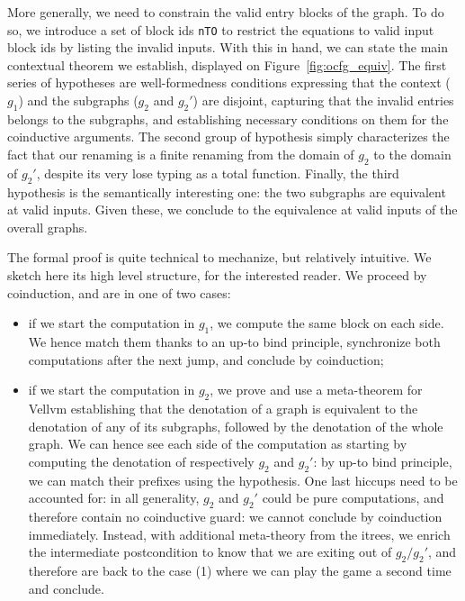 \documentclass[11pt]{article}
\newcommand{\inlinecoq}[1]{\mbox{\lstinline[style=customcoq,columns=fixed,basewidth=.48em]{#1}}}
\newcommand{\ilc}[1]{\inlinecoq{#1}}
\begin{document}
More generally, we need to constrain the valid entry blocks of the graph. 
To do so, we introduce a set of block ids \ilc{nTO} to restrict the equations to valid input block ids by listing the invalid inputs.
With this in hand, we can state the main contextual theorem we establish, displayed on Figure~\ref{fig:ocfg_equiv}.
The first series of hypotheses are well-formedness conditions expressing that the context ($g_1$) and the subgraphs ($g_2$ and $g_2'$) are disjoint,
capturing that the invalid entries belongs to the subgraphs,
and establishing necessary conditions on them for the coinductive arguments.
The second group of hypothesis simply characterizes the fact that our renaming is a finite renaming from the domain of $g_2$ to the domain of $g_2'$, despite its very lose typing as a total function.
Finally, the third hypothesis is the semantically interesting one: the two subgraphs are equivalent at valid inputs.
Given these, we conclude to the equivalence at valid inputs of the overall graphs.

The formal proof is quite technical to mechanize, but relatively intuitive. We sketch here its high level structure, for the interested reader. We proceed by coinduction, and are in one of two cases:
\begin{itemize}
\item if we start the computation in $g_1$, we compute the same block on each side. We hence match them thanks to an up-to bind principle, synchronize both computations after the next jump, and conclude by coinduction;
\item if we start the computation in $g_2$, we prove and use a meta-theorem for Vellvm establishing that the denotation of a graph is equivalent to the denotation of any of its subgraphs, followed by the denotation of the whole graph. We can hence see each side of the computation as starting by computing the denotation of respectively $g_2$ and $g_2'$: by up-to bind principle, we can match their prefixes using the hypothesis. One last hiccups need to be accounted for: in all generality, $g_2$ and $g_2'$ could be pure computations, and therefore contain no coinductive guard: we cannot conclude by coinduction immediately.
Instead, with additional meta-theory from the itrees, we enrich the intermediate postcondition to know that we are exiting out of $g_2/g_2'$, and therefore are back to the case (1) where we can play the game a second time and conclude.
\end{itemize}

\end{document}
